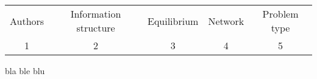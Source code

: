 \begin{landscape}
\begin{table}
\begin{tabular}[h]{ccccc}
  Authors & Information structure & Equilibrium & Network & Problem type \\
1 & 2 & 3 & 4 & 5
\end{tabular}
\end{table}
bla ble blu
\end{landscape}



